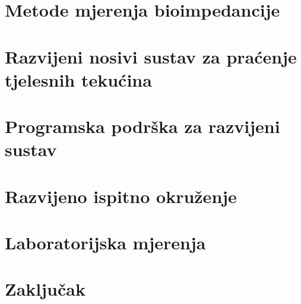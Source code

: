 \documentclass[diplomskirad, numeric, utf8, times]{fer}
\begin{document}
\chapter{Metode mjerenja bioimpedancije}
\label{chap:bioz}



\chapter{Razvijeni nosivi sustav za praćenje tjelesnih tekućina}



\chapter{Programska podrška za razvijeni sustav}
\label{chap:programska_podrska}



\chapter{Razvijeno ispitno okruženje}



\chapter{Laboratorijska mjerenja}



\chapter{Zaključak}
\label{pog:zakljucak}





\nocite{*}

\end{document}
